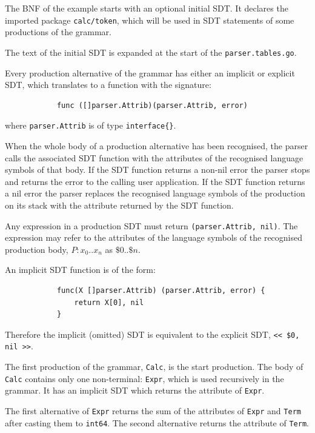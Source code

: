 \documentclass[12pt]{article}
\begin{document}
		The BNF of the example starts with an optional initial SDT. It declares the imported package \verb|calc/token|, which will be used in SDT statements of some productions of the grammar. 

		The text of the initial SDT is expanded at the start of the \verb|parser.tables.go|.

		Every production alternative of the grammar has either an implicit or explicit SDT, which translates to a function with the signature:

		\begin{verbatim}
			func ([]parser.Attrib)(parser.Attrib, error)
		\end{verbatim}

		where \verb|parser.Attrib| is of type \verb|interface{}|.

		When the whole body of a production alternative has been recognised, the parser calls the associated SDT function with the attributes of the recognised language symbols of that body. If the SDT function returns a non-nil error the parser stops and returns the error to the calling user application. If the SDT function returns a nil error the parser replaces the recognised language symbols of the production on its stack with the attribute returned by the SDT function.

		Any expression in a production SDT must return \verb|(parser.Attrib, nil)|. The expression may refer to the attributes of the language symbols of the recognised production body, $P : x_0 .. x_n$ as $\$0 .. \$n$.

		An implicit SDT function is of the form:

		\begin{verbatim}
			func(X []parser.Attrib) (parser.Attrib, error) {
			    return X[0], nil
			}
		\end{verbatim}

		Therefore the implicit (omitted) SDT is equivalent to the explicit SDT, \verb|<< $0, nil >>|.


		The first production of the grammar, \verb|Calc|,  is the start production. The body of \verb|Calc| contains only one non-terminal: \verb|Expr|, which is used recursively in the grammar. It has an implicit SDT which returns the attribute of \verb|Expr|.

		The first alternative of \verb|Expr| returns the sum of the attributes of \verb|Expr| and \verb|Term| after casting them to \verb|int64|. The second alternative returns the attribute of \verb|Term|.
\end{document}
